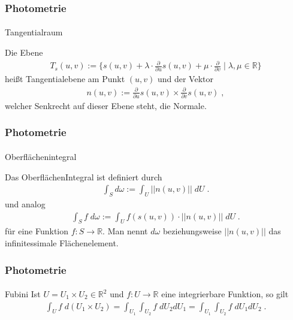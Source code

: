\documentclass{beamer}
\begin{document}
\begin{frame}
    \frametitle{Photometrie}
\framesubtitle{}
\begin{block}{Tangentialraum}

Die Ebene 
\begin{align*}
T_s(u,v) :=  \{ s(u,v) + \lambda \cdot \frac{\partial}{\partial u} s(u,v) + \mu \cdot \frac{\partial}{\partial v} \; | \; \lambda, \mu \in \mathbb{R} \}
\end{align*}
heißt Tangentialebene am Punkt $(u,v)$ und  der Vektor 
\begin{align*}
n (u,v):= \frac{\partial}{\partial u} s(u,v) \times \frac{\partial}{\partial v} s(u,v) \; ,
\end{align*}
welcher Senkrecht auf dieser Ebene steht,  die Normale.
\end{block}
\end{frame}

\begin{frame}
    \frametitle{Photometrie}
\framesubtitle{}
\begin{block}{Oberflächenintegral}

Das OberflächenIntegral ist definiert durch
\begin{align*}
\int_S d \omega:= \int_U ||n(u,v)|| \; dU \;.
\end{align*} 
und  analog
\begin{align*}
\int_S f \;  d \omega:= \int_U f(s(u,v)) \cdot ||n(u,v)|| \; dU \;.
\end{align*} 
für eine Funktion $f: S \to \mathbb{R}$.
Man nennt $d \omega$ beziehungsweise $ ||n(u,v)||$ das infinitessimale Flächenelement.
\end{block}
\end{frame}

\begin{frame}
    \frametitle{Photometrie}
\framesubtitle{}
\begin{block}{Fubini}
Ist $U = U_1 \times U_2 \in \mathbb{R}^2$ und $f: U \to \mathbb{R}$ eine integrierbare Funktion, so gilt
\begin{align*}
\int_U f \; d(U_1 \times U_2) = \int_{U_1} \int_{U_2} f  \;  dU_2 dU_1   = \int_{U_1} \int_{U_2} f  \;  dU_1 dU_2 \;.
\end{align*} 
\end{block}
\end{frame}
\end{document}
